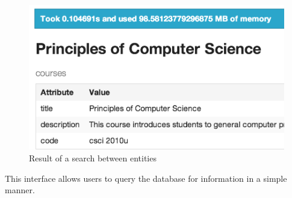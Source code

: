 	\begin{figure}[H]
		\centering
		\includegraphics[scale=0.5]{figures/images/step-5}
		
		\caption{Result of a search between entities}
		\label{fig:webui-step-5}
	\end{figure}
	
	This interface allows users to query the database for information in a simple manner.